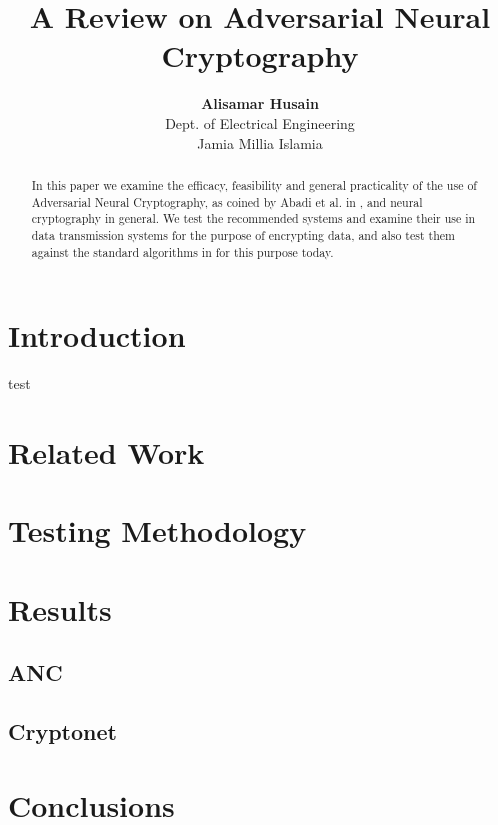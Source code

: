 \documentclass[12pt]{article}
\title{A Review on Adversarial Neural Cryptography}
\author{
  {\bf Alisamar Husain}\\
  Dept. of Electrical Engineering\\
  Jamia Millia Islamia
}
\date{}
\begin{document}
  \maketitle

  \begin{abstract}
    In this paper we examine the efficacy, feasibility and 
    general practicality of the use of Adversarial Neural Cryptography, 
    as coined by Abadi et al. in \cite{seminalanc}, and neural cryptography
    in general. We test the recommended systems and examine their use in 
    data transmission systems for the purpose of encrypting data, and also test
    them against the standard algorithms in for this purpose today.
  \end{abstract}
 
  \section{Introduction}
  test \cite{seminalanc}
  
  \section{Related Work}
  
  \section{Testing Methodology}
  \lipsum
  
  \section{Results}
    \subsection{ANC}
    \subsection{Cryptonet}
  
  \section{Conclusions}

  
  
\end{document}
